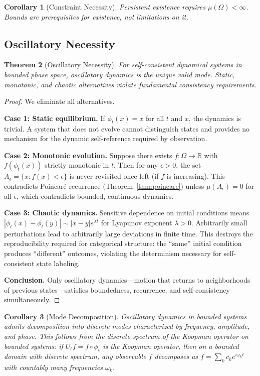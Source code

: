 \documentclass[11pt,a4paper]{article}
\newtheorem{theorem}{Theorem}[section]
\newtheorem{corollary}[theorem]{Corollary}
\theoremstyle{definition}
\theoremstyle{remark}
\newcommand{\Real}{\mathbb{R}}
\begin{document}
\begin{corollary}[Constraint Necessity]
Persistent existence requires $\mu(\Omega) < \infty$. Bounds are prerequisites for existence, not limitations on it.
\end{corollary}

\subsection{Oscillatory Necessity}

\begin{theorem}[Oscillatory Necessity]
\label{thm:oscillatory}
For self-consistent dynamical systems in bounded phase space, oscillatory dynamics is the unique valid mode. Static, monotonic, and chaotic alternatives violate fundamental consistency requirements.
\end{theorem}

\begin{proof}
We eliminate all alternatives.

\textbf{Case 1: Static equilibrium.} If $\phi_t(x) = x$ for all $t$ and $x$, the dynamics is trivial. A system that does not evolve cannot distinguish states and provides no mechanism for the dynamic self-reference required by observation.

\textbf{Case 2: Monotonic evolution.} Suppose there exists $f: \Omega \to \Real$ with $f(\phi_t(x))$ strictly monotonic in $t$. Then for any $\epsilon > 0$, the set $A_\epsilon = \{x : f(x) < \epsilon\}$ is never revisited once left (if $f$ is increasing). This contradicts Poincar\'e recurrence (Theorem~\ref{thm:poincare}) unless $\mu(A_\epsilon) = 0$ for all $\epsilon$, which contradicts bounded, continuous dynamics.

\textbf{Case 3: Chaotic dynamics.} Sensitive dependence on initial conditions means $|\phi_t(x) - \phi_t(y)| \sim |x - y| e^{\lambda t}$ for Lyapunov exponent $\lambda > 0$. Arbitrarily small perturbations lead to arbitrarily large deviations in finite time. This destroys the reproducibility required for categorical structure: the ``same'' initial condition produces ``different'' outcomes, violating the determinism necessary for self-consistent state labeling.

\textbf{Conclusion.} Only oscillatory dynamics---motion that returns to neighborhoods of previous states---satisfies boundedness, recurrence, and self-consistency simultaneously.
\end{proof}

\begin{corollary}[Mode Decomposition]
\label{cor:modes}
Oscillatory dynamics in bounded systems admits decomposition into discrete modes characterized by frequency, amplitude, and phase. This follows from the discrete spectrum of the Koopman operator \citep{koopman1931} on bounded systems: if $U_t f = f \circ \phi_t$ is the Koopman operator, then on a bounded domain with discrete spectrum, any observable $f$ decomposes as $f = \sum_k c_k e^{i\omega_k t}$ with countably many frequencies $\omega_k$.
\end{corollary}
\end{document}
